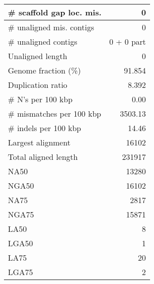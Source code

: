 \documentclass[12pt,a4paper]{article}
\begin{document}
\begin{table}[ht]
\begin{center}
\begin{tabular}{|l*{1}{|r}|}
\# scaffold gap loc. mis. & 0 \\ \hline
\# unaligned mis. contigs & 0 \\ \hline
\# unaligned contigs & 0 + 0 part \\ \hline
Unaligned length & 0 \\ \hline
Genome fraction (\%) & 91.854 \\ \hline
Duplication ratio & 8.392 \\ \hline
\# N's per 100 kbp & 0.00 \\ \hline
\# mismatches per 100 kbp & 3503.13 \\ \hline
\# indels per 100 kbp & 14.46 \\ \hline
Largest alignment & 16102 \\ \hline
Total aligned length & 231917 \\ \hline
NA50 & 13280 \\ \hline
NGA50 & 16102 \\ \hline
NA75 & 2817 \\ \hline
NGA75 & 15871 \\ \hline
LA50 & 8 \\ \hline
LGA50 & 1 \\ \hline
LA75 & 20 \\ \hline
LGA75 & 2 \\ \hline
\end{tabular}
\end{center}
\end{table}
\end{document}
